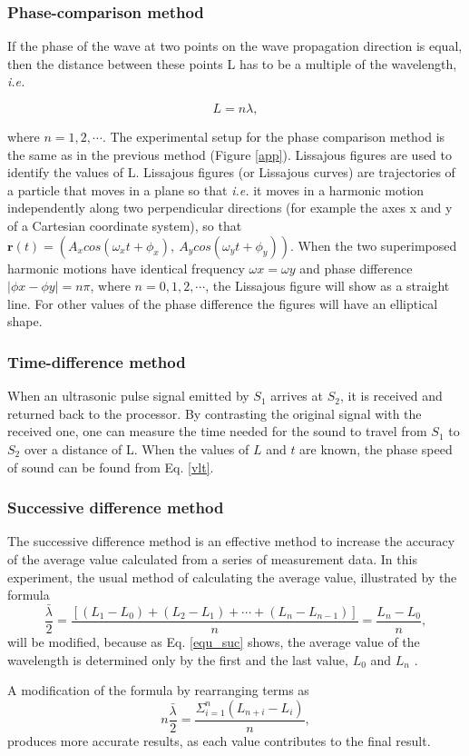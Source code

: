 \subsubsection{Phase-comparison method}

If the phase of the wave at two points on the wave propagation direction is
equal, then the distance between these points L has to be a multiple of the
wavelength, \emph{i.e.} 
    
\[
    L=n\lambda,
\]

where $n=1,2,\cdots$. The experimental setup for the phase comparison method
is the same as in the previous method (Figure \ref{app}). Lissajous figures
are used to identify the values of L. Lissajous figures (or Lissajous
curves) are trajectories of a particle that moves in a plane so that
\emph{i.e.} it moves in a harmonic motion independently along two
perpendicular directions (for example the axes x and y of a Cartesian
coordinate system), so that $\textbf{r}(t) = (A_x cos(\omega_x t + \phi_x
),\ A_y cos(\omega_y t + \phi_y ))$. When the two superimposed harmonic
motions have identical frequency $\omega x = \omega y$ and phase difference
$|\phi x - \phi y | = n\pi$, where $n = 0, 1, 2,\cdots$, the Lissajous
figure will show as a straight line. For other values of the phase
difference the figures will have an elliptical shape.\\ 

\subsubsection{Time-difference method}

When an ultrasonic pulse signal emitted by $S_1$ arrives at $S_2$, it is
received and returned back to the processor. By contrasting the original
signal with the received one, one can measure the time needed for the sound
to travel from $S_1$ to $S_2$ over a distance of L. When the values of $L$
and $t$ are known, the phase speed of sound can be found from Eq.
\ref{vlt}.
    
\subsubsection{Successive difference method}

The successive difference method is an effective method to increase the
accuracy of the average value calculated from a series of measurement data.
In this experiment, the usual method of calculating the average value,
illustrated by the formula 
\begin{equation}\label{equ_suc} 
\frac{\bar{\lambda}}{2}=\frac{[(L_1-L_0)+(L_2-L_1)+\cdots+(L_n-L_{n-1})]}{n}=\frac{L_n-L_0}{n},
\end{equation} 
will be modified, because as Eq. \ref{equ_suc} shows, the average value of
the wavelength is determined only by the first and the last value, $L_0$ and
$L_n$ . 

A modification of the formula by rearranging terms as
\begin{equation}\label{equ_suc}
    n\frac{\bar{\lambda}}{2}=\frac{\Sigma_{i=1}^{n}(L_{n+i}-L_i)}{n},
\end{equation}
produces more accurate results, as each value contributes to the final
result. 